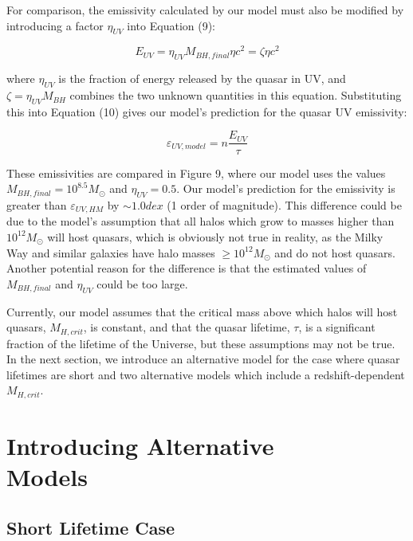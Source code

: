 \documentclass[12pt]{article}%
\begin{document}
\twocolumngrid


For comparison, the emissivity calculated by our model must also be modified by introducing a factor $\eta_{UV}$ into Equation (9):

\begin{equation}
    E_{UV}=\eta_{UV}M_{BH,final}\eta c^2=\zeta\eta c^2
\end{equation}

\noindent where $\eta_{UV}$ is the fraction of energy released by the quasar in UV, and $\zeta=\eta_{UV}M_{BH}$ combines the two unknown quantities in this equation. Substituting this into Equation (10) gives our model's prediction for the quasar UV emissivity:

\begin{equation}
    \varepsilon_{UV,model}=n\frac{E_{UV}}{\tau}
\end{equation}

\noindent These emissivities are compared in Figure 9, where our model uses the values $M_{BH,final}=10^{8.5}M_\odot$ and $\eta_{UV}=0.5$. Our model's prediction for the emissivity is greater than $\varepsilon_{UV,HM}$ by $\sim1.0dex$ (1 order of magnitude). This difference could be due to the model's assumption that all halos which grow to masses higher than $10^{12}M_\odot$ will host quasars, which is obviously not true in reality, as the Milky Way and similar galaxies have halo masses $\geq10^{12}M_\odot$ and do not host quasars. Another potential reason for the difference is that the estimated values of $M_{BH,final}$ and $\eta_{UV}$ could be too large.\par

Currently, our model assumes that the critical mass above which halos will host quasars, $M_{H,crit}$, is constant, and that the quasar lifetime, $\tau$, is a significant fraction of the lifetime of the Universe, but these assumptions may not be true. In the next section, we introduce an alternative model for the case where quasar lifetimes are short and two alternative models which include a redshift-dependent $M_{H,crit}$.

\section{Introducing Alternative\\Models}

\subsection{Short Lifetime Case}
\end{document}
